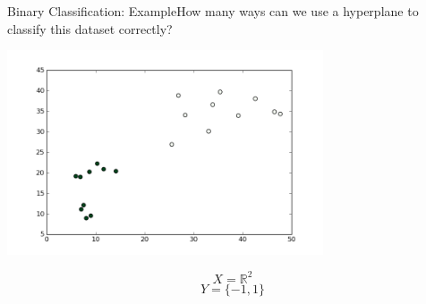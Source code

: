 \documentclass[xcolor=dvipsnames]{beamer}
\begin{document}
\begin{frame}{Binary Classification: Example}{How many ways can we use a hyperplane to classify this dataset correctly?}
    \begin{center}
        \includegraphics[width=0.7\textwidth]{figs/binclass_1.png}
    \end{center}
    $$X = \mathbb{R}^2$$
    $$Y = \{-1, 1\}$$
\end{frame}
\end{document}
